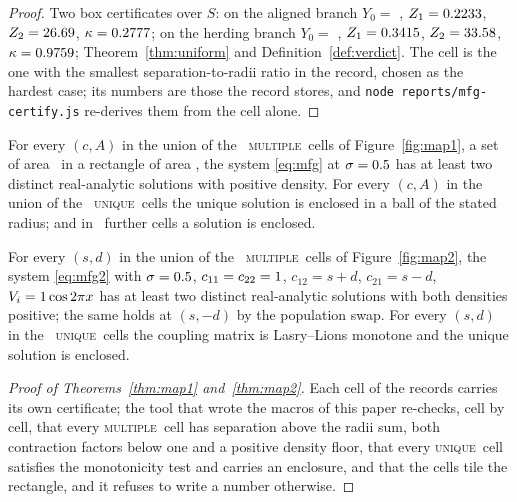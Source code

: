 \documentclass[11pt]{article}
\theoremstyle{definition}
\newcommand{\MULT}{\textup{\textsc{multiple}}}
\newcommand{\UNIQ}{\textup{\textsc{unique}}}
\begin{document}
\begin{proof}
Two box certificates over $S$: on the aligned branch $Y_0=$ \OneTightYzeroAligned, $Z_1=0.2233$, $Z_2=26.69$, $\kappa=0.2777$; on the herding branch $Y_0=$ \OneTightYzeroHerding, $Z_1=0.3415$, $Z_2=33.58$, $\kappa=0.9759$; Theorem~\ref{thm:uniform} and Definition~\ref{def:verdict}. The cell is the one with the smallest separation-to-radii ratio in the record, chosen as the hardest case; its numbers are those the record stores, and \texttt{node reports/mfg-certify.js} re-derives them from the cell alone.
\end{proof}

\begin{theorem}\label{thm:map1}
For every $(c,A)$ in the union of the \OneMult\ \MULT\ cells of Figure~\ref{fig:map1}, a set of area \OneMultArea\ in a rectangle of area \OneDomainArea, the system \eqref{eq:mfg} at $\sigma=0.5$ has at least two distinct real-analytic solutions with positive density. For every $(c,A)$ in the union of the \OneUniq\ \UNIQ\ cells the unique solution \cite{LL07} is enclosed in a ball of the stated radius; and in \OneUndEnclosed\ further cells a solution is enclosed.
\end{theorem}

\begin{theorem}\label{thm:map2}
For every $(s,d)$ in the union of the \TwoMult\ \MULT\ cells of Figure~\ref{fig:map2}, the system \eqref{eq:mfg2} with $\sigma=0.5$, $c_{11}=c_{22}=1$, $c_{12}=s+d$, $c_{21}=s-d$, $V_i=1\cos2\pi x$ has at least two distinct real-analytic solutions with both densities positive; the same holds at $(s,-d)$ by the population swap. For every $(s,d)$ in the \TwoUniq\ \UNIQ\ cells the coupling matrix is Lasry--Lions monotone and the unique solution is enclosed.
\end{theorem}

\begin{proof}[Proof of Theorems~\ref{thm:map1} and~\ref{thm:map2}]
Each cell of the records carries its own certificate; the tool that wrote the macros of this paper re-checks, cell by cell, that every \MULT\ cell has separation above the radii sum, both contraction factors below one and a positive density floor, that every \UNIQ\ cell satisfies the monotonicity test and carries an enclosure, and that the cells tile the rectangle, and it refuses to write a number otherwise.
\end{proof}
\end{document}
